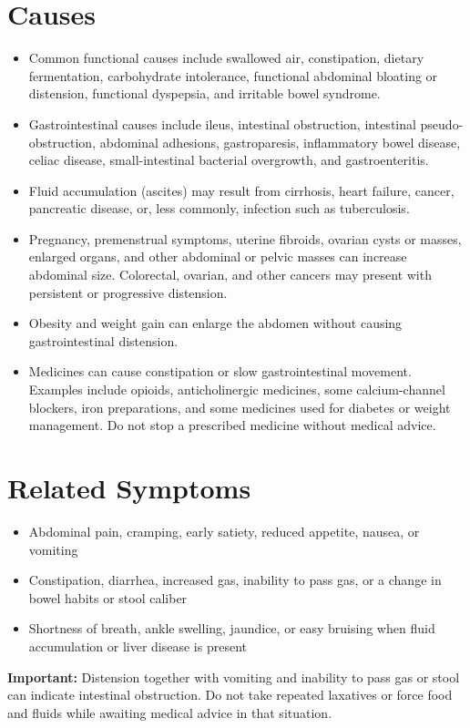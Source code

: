 \section*{Causes}
\begin{itemize}
  \item Common functional causes include swallowed air, constipation, dietary fermentation, carbohydrate intolerance, functional abdominal bloating or distension, functional dyspepsia, and irritable bowel syndrome.
  \item Gastrointestinal causes include ileus, intestinal obstruction, intestinal pseudo-obstruction, abdominal adhesions, gastroparesis, inflammatory bowel disease, celiac disease, small-intestinal bacterial overgrowth, and gastroenteritis.
  \item Fluid accumulation (ascites) may result from cirrhosis, heart failure, cancer, pancreatic disease, or, less commonly, infection such as tuberculosis.
  \item Pregnancy, premenstrual symptoms, uterine fibroids, ovarian cysts or masses, enlarged organs, and other abdominal or pelvic masses can increase abdominal size. Colorectal, ovarian, and other cancers may present with persistent or progressive distension.
  \item Obesity and weight gain can enlarge the abdomen without causing gastrointestinal distension.
  \item Medicines can cause constipation or slow gastrointestinal movement. Examples include opioids, anticholinergic medicines, some calcium-channel blockers, iron preparations, and some medicines used for diabetes or weight management. Do not stop a prescribed medicine without medical advice.
\end{itemize}

\section*{Related Symptoms}
\begin{itemize}
  \item Abdominal pain, cramping, early satiety, reduced appetite, nausea, or vomiting
  \item Constipation, diarrhea, increased gas, inability to pass gas, or a change in bowel habits or stool caliber
  \item Shortness of breath, ankle swelling, jaundice, or easy bruising when fluid accumulation or liver disease is present
\end{itemize}
\textbf{Important:} Distension together with vomiting and inability to pass gas or stool can indicate intestinal obstruction. Do not take repeated laxatives or force food and fluids while awaiting medical advice in that situation.

